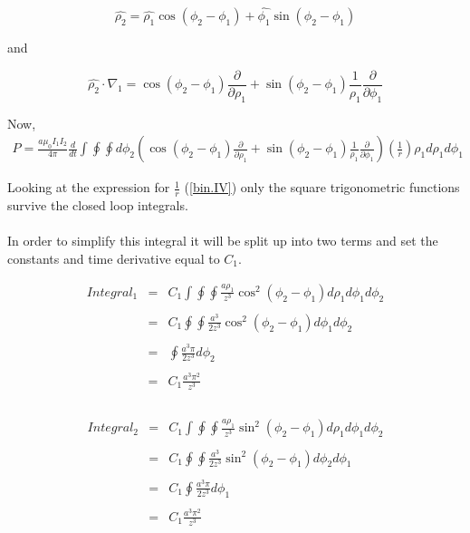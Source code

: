 \documentclass[12pt]{revtex4}
\begin{document}
\begin{equation}
\hat{\rho_2}=\hat{\rho_1}\cos(\phi_{2}-\phi_{1})+\hat{\phi_1}\sin(\phi_{2}-\phi_{1})
\end{equation}

and

\begin{equation}
\hat{\rho_2} \cdot \nabla_{1}=\cos(\phi_{2}-\phi_{1})\frac{\partial}{\partial \rho_1}+\sin(\phi_{2}-\phi_{1})\frac{1}{\rho_1}\frac{\partial}{\partial \phi_1}
\end{equation}


Now, 
\begin{eqnarray*}
P=\frac{a \mu_{0}I_{1}I_{2}}{4\pi} \frac{d}{dt}\int  \oint \oint  d\phi_{2} \left( \cos(\phi_{2}-\phi_{1})\frac{\partial}{\partial \rho_1}+\sin(\phi_{2}-\phi_{1})\frac{1}{\rho_1}\frac{\partial}{\partial \phi_1} \right)( \frac{1}{r})  \rho_{1} d\rho_{1} d\phi_{1} 
\end{eqnarray*}


Looking at the expression for $\frac{1}{r}$ (\ref{bin.IV}) only the square trigonometric functions survive the closed loop integrals. 
\\ \\
In order to simplify this integral it will be split up into two terms and set the constants and time derivative equal to $C_1$. 

\begin{eqnarray*}
Integral_1&=&C_1\int \oint \oint   \frac{a\rho_{1}}{z^3} \cos^{2}(\phi_{2} - \phi_{1}) d\rho_{1} d\phi_{1} d\phi_{2} \\ \\
&=&C_1\oint  \oint    \frac{a^3}{2z^3} \cos^{2}(\phi_{2} - \phi_{1})  d\phi_{1} d\phi_{2} \\ \\
&=&\oint \frac{a^3 \pi}{2z^3} d\phi_{2} \\ \\
&=&C_1\frac{ a^3 \pi^2}{z^3}  \\ \\
\end{eqnarray*}

\begin{eqnarray*}
Integral_2&=&C_1\int \oint \oint   \frac{a \rho_{1}}{z^3} \sin^{2}(\phi_{2} - \phi_{1}) d\rho_{1} d\phi_{1} d\phi_{2} \\ \\
&=&C_1 \oint \oint   \frac{a^3}{2z^3} \sin^{2}(\phi_{2} - \phi_{1})d\phi_{2}  d\phi_{1}  \\ \\
&=&C_1\oint \frac{a^3\pi}{2z^3}   d\phi_{1}  \\ \\
&=&C_1\frac{ a^3 \pi^2}{z^3}  \\ \\
\end{eqnarray*}
\end{document}

